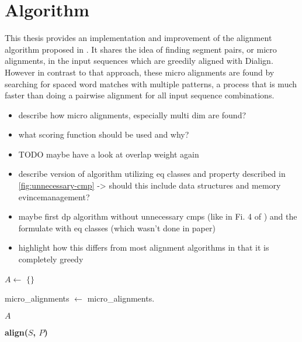 \chapter{Algorithm}
\label{chap:algorithm}
This thesis provides an implementation and improvement of the alignment algorithm proposed in \cite{hundt2020praktkium}. It shares the idea of finding segment pairs, or micro alignments, in the input sequences which are greedily aligned with Dialign. However in contrast to that approach, these micro alignments are found by searching for spaced word matches with multiple patterns, a process that is much faster than doing a pairwise alignment for all input sequence combinations. 
\begin{itemize}
	\item describe how micro alignments, especially multi dim are found?
	\item what scoring function should be used and why?
	\item TODO maybe have a look at overlap weight again
	\item describe version of algorithm utilizing eq classes and property described in \ref{fig:unnecessary-cmp} -> should this include data structures and memory evincemanagement?
	\item maybe first dp algorithm without unnecessary cmps (like in Fi. 4 of \cite{abdeddaim1997incremental}) and the formulate with eq classes (which wasn't done in paper) 
	\item highlight how this differs from most alignment algorithms in that it is completely greedy
\end{itemize}


\begin{algorithm}[h]
	\DontPrintSemicolon
	
	
	$A \leftarrow$ $\{\}$\;
	
	micro\_alignments $\leftarrow$ \;
	micro\_alignments.\sort{}\;
	
	\Return $A$\;
	
	\caption{\bf{align($S$, $P$)}}
	\label{alg:align}
\end{algorithm}

